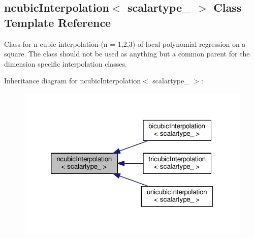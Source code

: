 \hypertarget{classncubicInterpolation}{}\subsection{ncubic\+Interpolation$<$ scalartype\+\_\+ $>$ Class Template Reference}
\label{classncubicInterpolation}


Class for n-\/cubic interpolation (n = 1,2,3) of local polynomial regression on a square. The class should not be used as anything but a common parent for the dimension specific interpolation classes.  




Inheritance diagram for ncubic\+Interpolation$<$ scalartype\+\_\+ $>$\+:\nopagebreak
\begin{figure}[H]
\begin{center}
\leavevmode
\includegraphics[width=320pt]{classncubicInterpolation__inherit__graph}
\end{center}
\end{figure}

